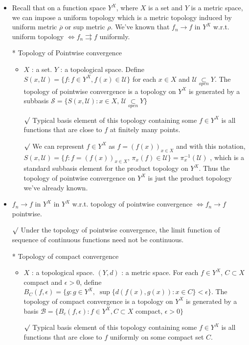 \documentclass[12pt]{article}
\newcommand{\rmk}{$\surd$}
\newcommand{\U}{\mathcal{U}}
\newcommand{\B}{\mathcal{B}}
\newcommand{\open}{\underset{open}{\subset}}
\begin{document}
\begin{itemize}
	\item Recall that on a function space $Y^X$, where $X$ is a set and $Y$ is a metric space, we can impose a uniform topology which is a metric topology induced by uniform metric $\overline{\rho}$ or sup metric $\rho$. We've known that $f_n\rightarrow f$ in $Y^X$ w.r.t. uniform topology $\Leftrightarrow f_n\rightrightarrows f$ uniformly.
	\item[*] Topology of Pointwise convergence
	\begin{itemize}
		\item $X$ : a set. $Y$ : a topological space. Define $S(x, \U)=\{f : f\in Y^X, f(x)\in \U\}$ for each $x\in X$ and $\U\open Y$. The topology of pointwise convergence is a topology on $Y^X$ is generated by a subbasis $\mathcal{S}=\{S(x, \U):x\in X,\, \U\open Y\}$
		\item[\rmk] Typical basis element of this topology containing some $f\in Y^X$ is all functions that are close to $f$ at finitely many points.
		\item[\rmk] We can represent $f\in Y^X$ as $f=(f(x))_{x\in X}$ and with this notation, \\$S(x, \U)=\{f : f=(f(x))_{x\in X}, \, \pi_{x}(f)\in \U\}=\pi_{x}^{-1}(\U)$ , which is a standard subbasis element for the product topology on $Y^X$. Thus the topology of pointwise convergence on $Y^X$ is just the product topology we've already known.
	\end{itemize}
	\item $f_n\rightarrow f$ in $Y^X$ in $Y^X$ w.r.t. topology of pointwise convergence $\Leftrightarrow f_n\rightarrow f$ pointwise.
	\item[\rmk] Under the topology of pointwise convergence, the limit function of sequence of continuous functions need not be continuous.
	\item[*] Topology of compact convergence
	\begin{itemize}
		\item $X$ : a topological space. $(Y,d)$ : a metric space. For each $f\in Y^X$, $C\subset X$ compact and $\epsilon>0$, define $B_C(f, \epsilon)=\{g : g\in Y^X,\;\sup\{d(f(x), g(x)):x\in C\}<\epsilon\}$. The topology of compact convergence is a topology on $Y^X$ is generated by a basis $\B=\{B_c(f, \epsilon) : f\in Y^X, C\subset X$ compact, $ \epsilon>0 \}$
		\item[\rmk] Typical basis element of this topology containing some $f\in Y^X$ is all functions that are close to $f$ uniformly on some compact set $C$. 

\end{itemize}
\end{itemize}
\end{document}
